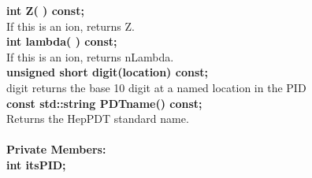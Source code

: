 \begin{tabbing}
\hspace{0.5in}  {\bf int Z( ) const; }\\
\hspace{1.0in}  If this is an ion, returns Z.\\
\hspace{0.5in}  {\bf int lambda( ) const; }\\
\hspace{1.0in}  If this is an ion, returns nLambda.\\
\hspace{0.5in}  {\bf unsigned short digit(location) const; }\\
\hspace{1.0in}  digit returns the base 10 digit at a named location in the PID \\
\hspace{0.5in}  {\bf const std::string PDTname() const; }\\
\hspace{1.0in}  Returns the HepPDT standard name. \\ \\

{\bf Private Members:} \\
\hspace{0.5in}  {\bf int itsPID; } \\

\end{tabbing}

\vfill\eject

